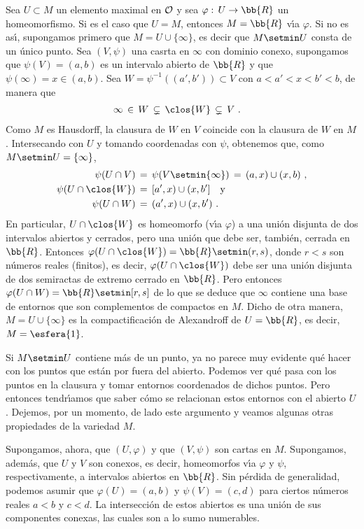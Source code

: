 Sea $U\subset M$ un elemento maximal en $\cal{O}$ y sea
$\varphi:\,U\rightarrow\bb{R}$ un homeomorfismo. Si es el caso que
$U=M$, entonces $M=\bb{R}$ v\'{\i}a $\varphi$. Si no es as\'{\i},
supongamos primero que $M=U\cup\{\infty\}$, es decir que $M\setmin U$
consta de un \'{u}nico punto. Sea $(V,\psi)$ una casrta en $\infty$
con dominio conexo, supongamos que $\psi(V)=(a,b)$ es un intervalo abierto
de $\bb{R}$ y que $\psi(\infty)=x\in (a,b)$. Sea
$W=\psi^{-1}((a',b'))\subset V$ con $a<a'<x<b'<b$, de manera que
\begin{align*}
	\infty & \,\in\, W\,\subsetneq\,\clos{W}\,\subsetneq\,V
	\text{ .}
\end{align*}
%
Como $M$ es Hausdorff, la clausura de $W$ en $V$ coincide con la clausura
de $W$ en $M$. Intersecando con $U$ y tomando coordenadas con $\psi$,
obtenemos que, como $M\setmin U=\{\infty\}$,
\begin{align*}
	\psi(U\cap V) & \,=\,\psi(V\setmin\{\infty\}) \,=\,(a,x)\cup (x,b)
		\text{ ,} \\
	\psi(U\cap\clos{W}) & \,=\,[a',x)\cup (x,b']
		\quad\text{y} \\
	\psi(U\cap W) & \,=\,(a',x)\cup (x,b')
	\text{ .}
\end{align*}
%
En particular, $U\cap\clos{W}$ es homeomorfo (v\'{\i}a $\varphi$)
a una uni\'{o}n disjunta de dos intervalos abiertos y cerrados, pero una
uni\'{o}n que debe ser, tambi\'{e}n, cerrada en $\bb{R}$. Entonces
$\varphi(U\cap\clos{W})=\bb{R}\setmin (r,s)$, donde $r<s$ son n\'{u}meros
reales (finitos), es decir, $\varphi(U\cap\clos{W})$ debe ser una uni\'{o}n
disjunta de dos semiractas de extremo cerrado en $\bb{R}$. Pero
entonces $\varphi(U\cap W)=\bb{R}\setmin [r,s]$ de lo que se deduce que
$\infty$ contiene una base de entornos que son complementos de compactos
en $M$. Dicho de otra manera, $M=U\cup\{\infty\}$ es la compactificaci\'{o}n
de Alexandroff de $U=\bb{R}$, es decir, $M=\esfera{1}$.

Si $M\setmin U$ contiene m\'{a}s de un punto, ya no parece muy evidente
qu\'{e} hacer con los puntos que est\'{a}n por fuera del abierto. Podemos
ver qu\'{e} pasa con los puntos en la clausura y tomar entornos coordenados
de dichos puntos. Pero entonces tendr\'{\i}amos que saber c\'{o}mo se
relacionan estos entornos con el abierto $U$. Dejemos, por un momento, de
lado este argumento y veamos algunas otras propiedades de la variedad $M$.

Supongamos, ahora, que $(U,\varphi)$ y que $(V,\psi)$ son cartas en $M$.
Supongamos, adem\'{a}s, que $U$ y $V$ son conexos, es decir, homeomorfos
v\'{\i}a $\varphi$ y $\psi$, respectivamente, a intervalos abiertos en
$\bb{R}$. Sin p\'{e}rdida de generalidad, podemos asumir que
$\varphi(U)=(a,b)$ y $\psi(V)=(c,d)$ para ciertos n\'{u}meros reales
$a<b$ y $c<d$. La intersecci\'{o}n de estos abiertos es una uni\'{o}n
de sus componentes conexas, las cuales son a lo sumo numerables.

